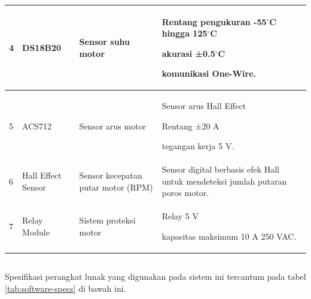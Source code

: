 \documentclass{elsinta}
\begin{document}
\begin{longtable} {|p{1cm}|p{3cm}|p{3cm}|p{6cm}|}
    4 &
    DS18B20\cite{DS18B20} &
    Sensor suhu motor &
    Rentang pengukuran -55$^\circ$C hingga 125$^\circ$C
    
    akurasi ±0.5$^\circ$C
    
    komunikasi One-Wire. \\
    \hline
    
    5 &
    ACS712\cite{ACS712}&
    Sensor arus motor &
    Sensor arus Hall Effect
    
    Rentang ±20 A
    
    tegangan kerja 5 V. \\
    \hline
    
    6 &
    Hall Effect Sensor\cite{A3144} &
    Sensor kecepatan putar motor (RPM) &
    Sensor digital berbasis efek Hall untuk mendeteksi jumlah putaran poros motor. \\
    \hline
    
    7 &
    Relay Module &
    Sistem proteksi motor &
    Relay 5 V
    
    kapasitas maksimum 10 A 250 VAC. \\
    \hline
\end{longtable}

\subsection{\SoftwareSpecTitle}
Spesifikasi perangkat lunak yang digunakan
pada sistem ini tercantum pada tabel \ref{tab:software-specs}
di bawah ini.
\end{document}
